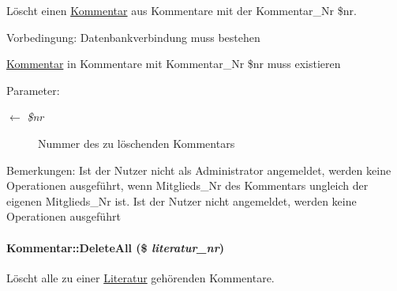 Löscht einen \hyperlink{classKommentar}{Kommentar} aus Kommentare mit der Kommentar\_\-Nr \$nr. \begin{Desc}
\item[Vorbedingung:]Datenbankverbindung muss bestehen 

\hyperlink{classKommentar}{Kommentar} in Kommentare mit Kommentar\_\-Nr \$nr muss existieren \end{Desc}
\begin{Desc}
\item[Parameter:]
\begin{description}
\item[\mbox{$\leftarrow$} {\em \$nr}]Nummer des zu löschenden Kommentars \end{description}
\end{Desc}
\begin{Desc}
\item[Bemerkungen:]Ist der Nutzer nicht als Administrator angemeldet, werden keine Operationen ausgeführt, wenn Mitglieds\_\-Nr des Kommentars ungleich der eigenen Mitglieds\_\-Nr ist. Ist der Nutzer nicht angemeldet, werden keine Operationen ausgeführt \end{Desc}
\hypertarget{classKommentar_9903f1df98f71eefa3b44a81d6a8ee5c}{
\paragraph[DeleteAll]{\setlength{\rightskip}{0pt plus 5cm}Kommentar::Delete\-All (\$ {\em literatur\_\-nr})}\hfill}
\label{classKommentar_9903f1df98f71eefa3b44a81d6a8ee5c}


Löscht alle zu einer \hyperlink{classLiteratur}{Literatur} gehörenden Kommentare. 


